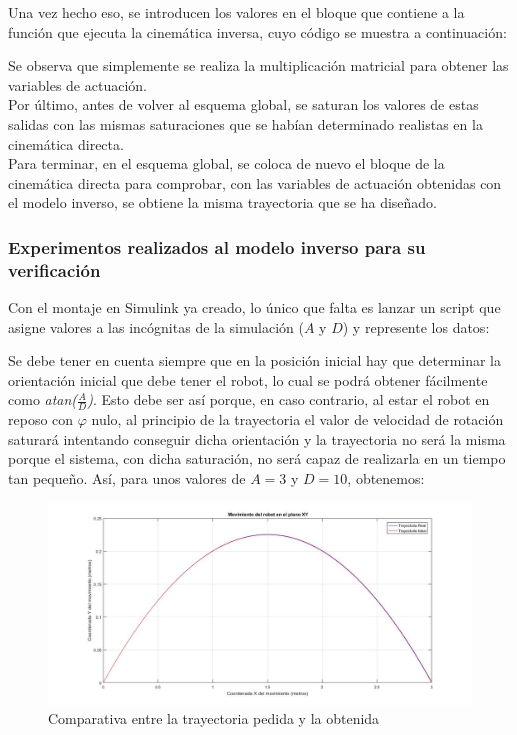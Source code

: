 \documentclass[a4paper,twoside]{article}
\begin{document}
\newpage
Una vez hecho eso, se introducen los valores en el bloque que contiene a la función que ejecuta la cinemática inversa, cuyo código se muestra a continuación:



Se observa que simplemente se realiza la multiplicación matricial para obtener las variables de actuación.\\

Por último, antes de volver al esquema global, se saturan los valores de estas salidas con las mismas saturaciones que se habían determinado realistas en la cinemática directa.\\
Para terminar, en el esquema global, se coloca de nuevo el bloque de la cinemática directa para comprobar, con las variables de actuación obtenidas con el modelo inverso, se obtiene la misma trayectoria que se ha diseñado.\\

\newpage
\subsubsection{Experimentos realizados al modelo inverso para su verificación}
Con el montaje en Simulink ya creado, lo único que falta es lanzar un script que asigne valores a las incógnitas de la simulación ($A$ y $D$) y represente los datos:

Se debe tener en cuenta siempre que en la posición inicial hay que determinar la orientación inicial que debe tener el robot, lo cual se podrá obtener fácilmente como \textit{atan($\frac{A}{D}$)}. Esto debe ser así porque, en caso contrario, al estar el robot en reposo con $\varphi$ nulo, al principio de la trayectoria el valor de velocidad de rotación saturará intentando conseguir dicha orientación y la trayectoria no será la misma porque el sistema, con dicha saturación, no será capaz de realizarla en un tiempo tan pequeño. Así, para unos valores de $A=3$ y $D=10$, obtenemos:

\begin{figure}[h!]
	\centering
	\includegraphics[width=.8\textwidth]{parab_1}
	\caption{Comparativa entre la trayectoria pedida y la obtenida}
\end{figure}
\end{document}
